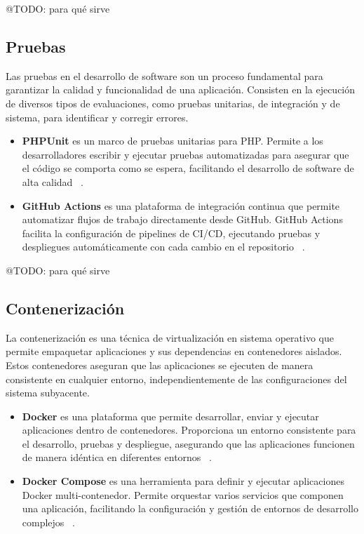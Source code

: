 \colorbox{color_highlight}{@TODO: para qué sirve}

\subsection*{Pruebas}

Las pruebas en el desarrollo de software son un proceso fundamental para garantizar la calidad y funcionalidad de una
aplicación.
Consisten en la ejecución de diversos tipos de evaluaciones, como pruebas unitarias, de integración y de sistema, para
identificar y corregir errores.

\begin{itemize}
    \item \textbf{PHPUnit} es un marco de pruebas unitarias para PHP. Permite a los desarrolladores escribir y
    ejecutar pruebas automatizadas para asegurar que el código se comporta como se espera, facilitando el desarrollo de
    software de alta calidad ~\cite{https://phpunit.de/manual/current/en/}.
    \item \textbf{GitHub Actions} es una plataforma de integración continua que permite automatizar flujos de
    trabajo directamente desde GitHub.
    GitHub Actions facilita la configuración de pipelines de CI/CD, ejecutando pruebas y despliegues automáticamente con
    cada cambio en el repositorio ~\cite{https://docs.github.com/en/actions}.
\end{itemize}

\colorbox{color_highlight}{@TODO: para qué sirve}

\subsection*{Contenerización}

La contenerización es una técnica de virtualización en sistema operativo que permite empaquetar aplicaciones y
sus dependencias en contenedores aislados.
Estos contenedores aseguran que las aplicaciones se ejecuten de manera consistente en cualquier entorno,
independientemente de las configuraciones del sistema subyacente.

\begin{itemize}
    \item \textbf{Docker} es una plataforma que permite desarrollar, enviar y ejecutar aplicaciones dentro de
    contenedores.
    Proporciona un entorno consistente para el desarrollo, pruebas y despliegue, asegurando que las aplicaciones
    funcionen de manera idéntica en diferentes entornos ~\cite{https://docs.docker.com/}.
    \item \textbf{Docker Compose} es una herramienta para definir y ejecutar aplicaciones Docker multi-contenedor.
    Permite orquestar varios servicios que componen una aplicación, facilitando la configuración y gestión de entornos
    de desarrollo complejos ~\cite{https://docs.docker.com/compose/}.
\end{itemize}

